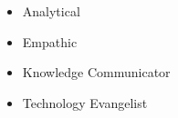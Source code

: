 %
%
%

\twocolumnsection
{
\begin{skills}
\end{skills}}
{
\vspace{1em}
\begin{itemize}
    \item Analytical
	\item Empathic
	\item Knowledge Communicator
    \item Technology Evangelist
\end{itemize}
}
